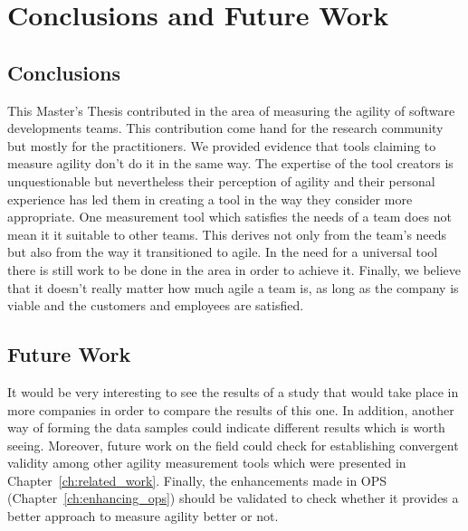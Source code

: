 \chapter{Conclusions and Future Work}
\label{ch:conclusions_future_work}

\section{Conclusions}

This Master's Thesis contributed in the area of measuring the agility of software developments teams. This contribution come hand for the research community but mostly for the practitioners. We provided evidence that tools claiming to measure agility don't do it in the same way. The expertise of the tool creators is unquestionable but nevertheless their perception of agility and their personal experience has led them in creating a tool in the way they consider more appropriate. One measurement tool which satisfies the needs of a team does not mean it it suitable to other teams. This derives not only from the team's needs but also from the way it transitioned to agile. In the need for a universal tool there is still work to be done in the area in order to achieve it. Finally, we believe that it doesn't really matter how much agile a team is, as long as the company is viable and the customers and employees are satisfied.

\section{Future Work}

It would be very interesting to see the results of a study that would take place in more companies in order to compare the results of this one. In addition, another way of forming the data samples could indicate different results which is worth seeing. Moreover, future work on the field could check for establishing convergent validity among other agility measurement tools which were presented in Chapter~\ref{ch:related_work}. Finally, the enhancements made in \ac{OPS} (Chapter~\ref{ch:enhancing_ops}) should be validated to check whether it provides a better approach to measure agility better or not.